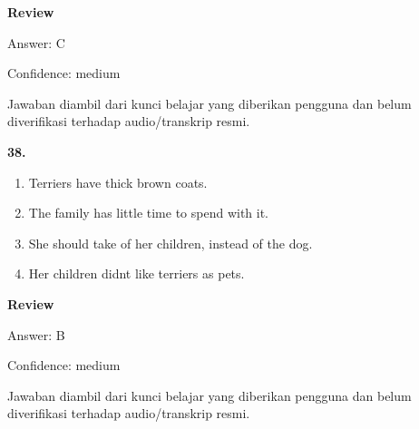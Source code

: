 \documentclass[12pt]{article}
\begin{document}
\par
\begingroup
\setlength{\parskip}{0pt}
\setlength{\parindent}{0pt}
\textbf{Review}\par
Answer: C\par
Confidence: medium\par
Jawaban diambil dari kunci belajar yang diberikan pengguna dan belum diverifikasi terhadap audio/transkrip resmi.\par
\endgroup
\par
\vspace{0.25\baselineskip}
\noindent\textbf{38.}
\begin{enumerate}[label=(\Alph*),leftmargin=*,itemsep=0.2em]
\item Terriers have thick brown coats.
\item The family has little time to spend with it.
\item She should take of her children, instead of the dog.
\item Her children didnt like terriers as pets.
\end{enumerate}
\par
\begingroup
\setlength{\parskip}{0pt}
\setlength{\parindent}{0pt}
\textbf{Review}\par
Answer: B\par
Confidence: medium\par
Jawaban diambil dari kunci belajar yang diberikan pengguna dan belum diverifikasi terhadap audio/transkrip resmi.\par
\endgroup
\par
\vspace{0.25\baselineskip}
\end{document}
